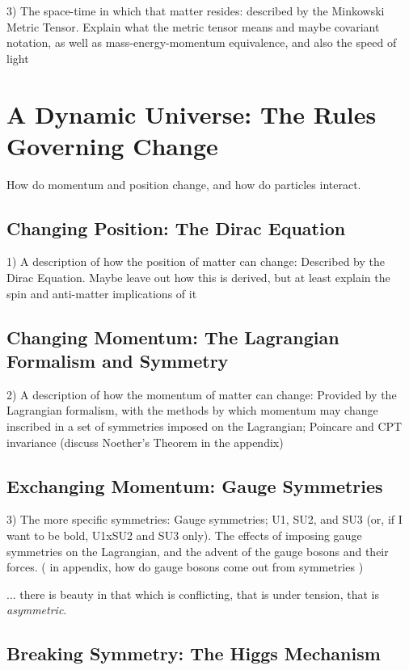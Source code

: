     3) The space-time in which that matter resides: described by the Minkowski Metric Tensor.
        Explain what the metric tensor means and maybe covariant notation,
        as well as mass-energy-momentum equivalence,
        and also the speed of light



\section{A Dynamic Universe: The Rules Governing Change}

    How do momentum and position change, and how do particles interact.

    \subsection{Changing Position: The Dirac Equation}

    1) A description of how the position of matter can change: Described by the Dirac Equation.
        Maybe leave out how this is derived, but at least explain the spin and anti-matter implications of it

    \subsection{Changing Momentum: The Lagrangian Formalism and Symmetry}

    2) A description of how the momentum of matter can change: Provided by the Lagrangian formalism,
        with the methods by which momentum may change inscribed in a set of symmetries imposed on the Lagrangian;
        Poincare and CPT invariance (discuss Noether's Theorem in the appendix)

    \subsection{Exchanging Momentum: Gauge Symmetries}

    3) The more specific symmetries:
        Gauge symmetries; U1, SU2, and SU3 (or, if I want to be bold, U1xSU2 and SU3 only).
        The effects of imposing gauge symmetries on the Lagrangian, and the advent of the gauge bosons and their forces.
        ( in appendix, how do gauge bosons come out from symmetries )


        ... there is beauty in that which is conflicting, that is under tension, that is \textit{asymmetric}.

    \subsection{Breaking Symmetry: The Higgs Mechanism}


